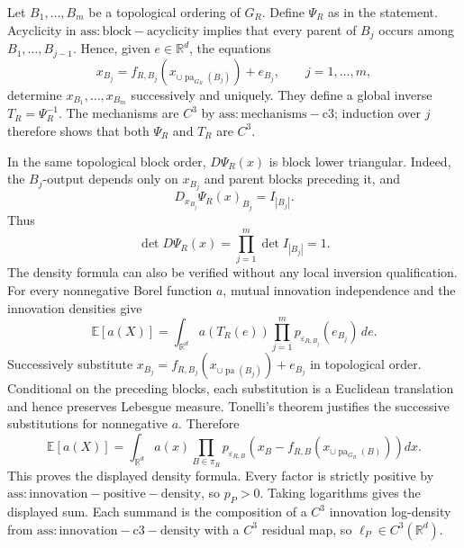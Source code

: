 Let \(B_1,\ldots,B_m\) be a topological ordering of \(G_R\).  Define \(\Psi_R\) as in the statement.  Acyclicity in \(\mathrm{ass:block-acyclicity}\) implies that every parent of \(B_j\) occurs among \(B_1,\ldots,B_{j-1}\).  Hence, given \(e\in\mathbb R^d\), the equations
\[
 x_{B_j}=f_{R,B_j}\!\left(x_{\cup\operatorname{pa}_{G_R}(B_j)}\right)+e_{B_j},
 \qquad j=1,\ldots,m,
\]
determine \(x_{B_1},\ldots,x_{B_m}\) successively and uniquely.  They define a global inverse \(T_R=\Psi_R^{-1}\).  The mechanisms are \(C^3\) by \(\mathrm{ass:mechanisms-c3}\); induction over \(j\) therefore shows that both \(\Psi_R\) and \(T_R\) are \(C^3\).

In the same topological block order, \(D\Psi_R(x)\) is block lower triangular.  Indeed, the \(B_j\)-output depends only on \(x_{B_j}\) and parent blocks preceding it, and
\[
 D_{x_{B_j}}\Psi_R(x)_{B_j}=I_{|B_j|}.
\]
Thus
\[
 \det D\Psi_R(x)=\prod_{j=1}^m\det I_{|B_j|}=1.
\]
The density formula can also be verified without any local inversion qualification.  For every nonnegative Borel function \(a\), mutual innovation independence and the innovation densities give
\[
 \mathbb E[a(X)]
 =\int_{\mathbb R^d}a(T_R(e))\prod_{j=1}^m p_{\varepsilon_{R,B_j}}(e_{B_j})\,de.
\]
Successively substitute \(x_{B_j}=f_{R,B_j}(x_{\cup\operatorname{pa}(B_j)})+e_{B_j}\) in topological order.  Conditional on the preceding blocks, each substitution is a Euclidean translation and hence preserves Lebesgue measure.  Tonelli's theorem justifies the successive substitutions for nonnegative \(a\).  Therefore
\[
 \mathbb E[a(X)]
 =\int_{\mathbb R^d}a(x)
 \prod_{B\in\pi_R}p_{\varepsilon_{R,B}}\!\left(x_B-f_{R,B}(x_{\cup\operatorname{pa}_{G_R}(B)})\right)dx.
\]
This proves the displayed density formula.  Every factor is strictly positive by \(\mathrm{ass:innovation-positive-density}\), so \(p_P>0\).  Taking logarithms gives the displayed sum.  Each summand is the composition of a \(C^3\) innovation log-density from \(\mathrm{ass:innovation-c3-density}\) with a \(C^3\) residual map, so \(\ell_P\in C^3(\mathbb R^d)\).